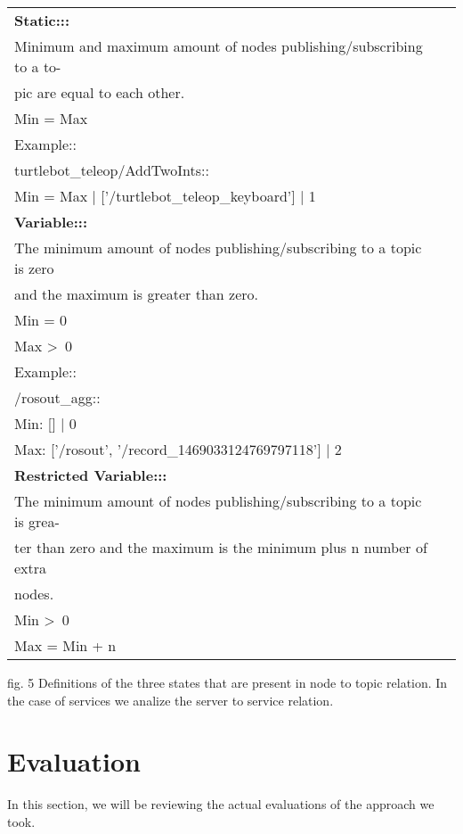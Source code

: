 \documentclass[10pt, conference]{IEEEtran}
\begin{document}
\begin{table}[h!]
 \begin{tabular}{l c} 
\hline
\textbf{Static:::} \\
Minimum and maximum amount of nodes publishing/subscribing to a to- \\
pic are equal to each other.  \\
Min = Max \\
Example:: \\
turtlebot\_teleop/AddTwoInts:: \\
Min = Max |  ['/turtlebot\_teleop\_keyboard'] |  1 \\
\hline

\textbf{Variable:::} \\
The minimum amount of nodes publishing/subscribing to a topic is zero \\
and the maximum is greater than zero. \\
Min = 0 \\
Max \textgreater \ 0 \\
Example:: \\
/rosout\_agg:: \\
Min: [] | 0 \\
Max: ['/rosout', '/record\_1469033124769797118'] | 2 \\

\hline
\textbf{Restricted Variable:::} \\
The minimum amount of nodes publishing/subscribing to a topic is grea- \\
ter than zero and the maximum is the minimum plus n number of extra \\
 nodes. \\
Min \textgreater \  0 \\
Max = Min + n \\
\hline
 \end{tabular}
 \begin{tablenotes}
	\scriptsize
      \item fig. 5 Definitions of the three states that are present in node to topic relation. In the case of services we analize the server to service relation.
    \end{tablenotes}
\end{table}

\section{Evaluation}
In this section, we will be reviewing the actual evaluations of the approach we took.
\end{document}
